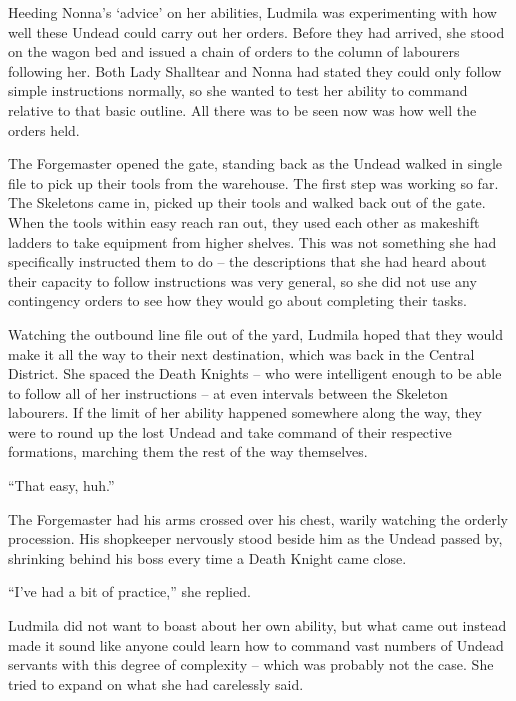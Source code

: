  

Heeding Nonna’s ‘advice’ on her abilities, Ludmila was experimenting with how well these Undead could carry out her orders. Before they had arrived, she stood on the wagon bed and issued a chain of orders to the column of labourers following her. Both Lady Shalltear and Nonna had stated they could only follow simple instructions normally, so she wanted to test her ability to command relative to that basic outline. All there was to be seen now was how well the orders held.

 

The Forgemaster opened the gate, standing back as the Undead walked in single file to pick up their tools from the warehouse. The first step was working so far. The Skeletons came in, picked up their tools and walked back out of the gate. When the tools within easy reach ran out, they used each other as makeshift ladders to take equipment from higher shelves. This was not something she had specifically instructed them to do – the descriptions that she had heard about their capacity to follow instructions was very general, so she did not use any contingency orders to see how they would go about completing their tasks.

 

Watching the outbound line file out of the yard, Ludmila hoped that they would make it all the way to their next destination, which was back in the Central District. She spaced the Death Knights – who were intelligent enough to be able to follow all of her instructions – at even intervals between the Skeleton labourers. If the limit of her ability happened somewhere along the way, they were to round up the lost Undead and take command of their respective formations, marching them the rest of the way themselves.

 

“That easy, huh.”

 

The Forgemaster had his arms crossed over his chest, warily watching the orderly procession. His shopkeeper nervously stood beside him as the Undead passed by, shrinking behind his boss every time a Death Knight came close.

 

“I’ve had a bit of practice,” she replied.

 

Ludmila did not want to boast about her own ability, but what came out instead made it sound like anyone could learn how to command vast numbers of Undead servants with this degree of complexity – which was probably not the case. She tried to expand on what she had carelessly said.

